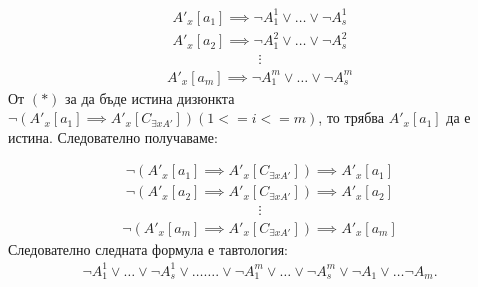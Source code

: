 \documentclass[french]{article}
\begin{document}
\begin{align*}
 A'_x[a_1] \implies \neg A_1^1 \lor  \dots \lor  \neg A_s^1
\end{align*}
\begin{align*}
A'_x[a_2] \implies \neg A_1^2 \lor  \dots \lor  \neg A_s^2
\end{align*}
\begin{align*}
\vdots
\end{align*}
\begin{align*}
A'_x[a_m] \implies \neg A_1^m \lor  \dots \lor  \neg A_s^m
\end{align*}
От $(*)$  за да бъде истина дизюнкта $\neg (A'_x[a_1] \implies A'_x[C_{\exists x A'}]) (1<=i<=m)$, то трябва $A'_x[a_1]$ да е истина. Следователно получаваме:

\begin{align*}
\neg (A'_x[a_1] \implies A'_x[C_{\exists x A'}]) \implies A'_x[a_1]
\end{align*}
\begin{align*}
\neg (A'_x[a_2] \implies A'_x[C_{\exists x A'}]) \implies A'_x[a_2]
\end{align*}
\begin{align*}
\vdots
\end{align*}
\begin{align*}
\neg (A'_x[a_m] \implies A'_x[C_{\exists x A'}]) \implies A'_x[a_m]
\end{align*}
Следователно следната формула е тавтология:
\begin{align*}
\neg A_1^1 \lor \dots \lor \neg A_s^1 \lor \dots \dots.  \lor \neg A_1^m \lor \dots \lor \neg A_s^m \lor \neg A_1 \lor \dots \neg A_m.
\end{align*}
\end{document}
